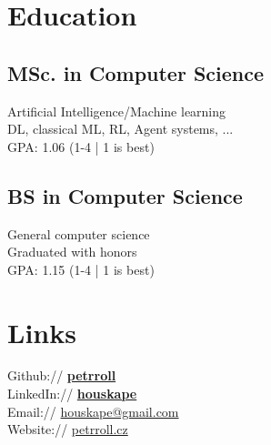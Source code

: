 \documentclass[a4paper]{deedy-resume} %
\begin{document}
\begin{minipage}[t]{0.33\textwidth} %


\section{Education} 

\subsection{MSc. in Computer Science}
Artificial Intelligence/Machine learning \\
DL, classical ML, RL, Agent systems, ... \\
GPA: 1.06 (1-4 | 1 is best) \\

\sectionspace %

\subsection{BS in Computer Science}
General computer science \\
Graduated with honors \\
GPA: 1.15 (1-4 | 1 is best) \\

\sectionspace %


\section{Links} 

Github:// \href{https://github.com/petrroll}{\bf petrroll} \\
LinkedIn:// \href{https://www.linkedin.com/in/houskape}{\bf houskape} \\
Email:// \href{mailto:houskape@gmail.com}{houskape@gmail.com} \\
Website:// \href{http://www.petrroll.cz}{petrroll.cz} \\


\end{minipage}
\end{document}

